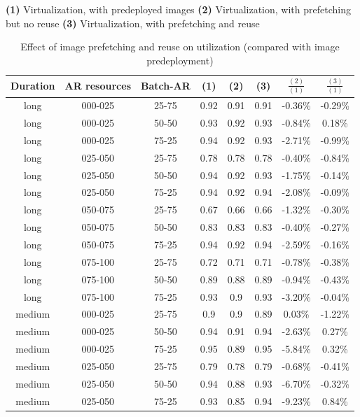 \begin{table}
\begin{center}
\caption{Effect of image prefetching and reuse on utilization (compared with image predeployment)}
\textbf{(1)} Virtualization, with predeployed images
\textbf{(2)} Virtualization, with prefetching but no reuse
\textbf{(3)} Virtualization, with prefetching and reuse
\begin{tabular}{|c|c|c|c|c|c|c|c|}
\hline
\textbf{Duration} & \textbf{AR resources} & \textbf{Batch-AR} & \textbf{(1)} & \textbf{(2)} & \textbf{(3)} &  \textbf{$\frac{(2)}{(1)}$} & \textbf{$\frac{(3)}{(1)}$}
\\\hline
long & 000-025 & 25-75 & 0.92 & 0.91 & 0.91 & -0.36\% & -0.29\%
\\\hline
long & 000-025 & 50-50 & 0.93 & 0.92 & 0.93 & -0.84\% & 0.18\%
\\\hline
long & 000-025 & 75-25 & 0.94 & 0.92 & 0.93 & -2.71\% & -0.99\%
\\\hline
long & 025-050 & 25-75 & 0.78 & 0.78 & 0.78 & -0.40\% & -0.84\%
\\\hline
long & 025-050 & 50-50 & 0.94 & 0.92 & 0.93 & -1.75\% & -0.14\%
\\\hline
long & 025-050 & 75-25 & 0.94 & 0.92 & 0.94 & -2.08\% & -0.09\%
\\\hline
long & 050-075 & 25-75 & 0.67 & 0.66 & 0.66 & -1.32\% & -0.30\%
\\\hline
long & 050-075 & 50-50 & 0.83 & 0.83 & 0.83 & -0.40\% & -0.27\%
\\\hline
long & 050-075 & 75-25 & 0.94 & 0.92 & 0.94 & -2.59\% & -0.16\%
\\\hline
long & 075-100 & 25-75 & 0.72 & 0.71 & 0.71 & -0.78\% & -0.38\%
\\\hline
long & 075-100 & 50-50 & 0.89 & 0.88 & 0.89 & -0.94\% & -0.43\%
\\\hline
long & 075-100 & 75-25 & 0.93 & 0.9 & 0.93 & -3.20\% & -0.04\%
\\\hline
medium & 000-025 & 25-75 & 0.9 & 0.9 & 0.89 & 0.03\% & -1.22\%
\\\hline
medium & 000-025 & 50-50 & 0.94 & 0.91 & 0.94 & -2.63\% & 0.27\%
\\\hline
medium & 000-025 & 75-25 & 0.95 & 0.89 & 0.95 & -5.84\% & 0.32\%
\\\hline
medium & 025-050 & 25-75 & 0.79 & 0.78 & 0.79 & -0.68\% & -0.41\%
\\\hline
medium & 025-050 & 50-50 & 0.94 & 0.88 & 0.93 & -6.70\% & -0.32\%
\\\hline
medium & 025-050 & 75-25 & 0.93 & 0.85 & 0.94 & -9.23\% & 0.84\%

\end{tabular}
\end{center}
\end{table}
